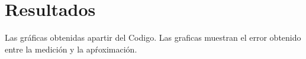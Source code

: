 \documentclass[12pt,a4paper,openright]{article}
\begin{document}
\section*{Resultados}

Las gráficas obtenidas apartir del Codigo. Las graficas muestran el error obtenido entre la medición y la apŕoximación.\\

\begin{figure}[htb]
\centering
{} \hspace{10mm}

\end{figure}
\end{document}

